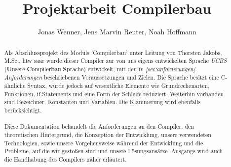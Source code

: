 \documentclass[12pt, a4paper, oneside, ngerman]{article}
\title{Projektarbeit Compilerbau}
\begin{document}
\author{Jonas Wenner, Jens Marvin Reuter, Noah Hoffmann}

\maketitle
\thispagestyle{empty}
\pagebreak
\tableofcontents
\newpage


\begin{abstract}

\noindent
Als Abschlussprojekt des Moduls 'Compilerbau' unter Leitung von Thorsten Jakobs, M.Sc., htw saar wurde dieser Compiler zur von uns eigens entwickelten Sprache \textit{UCBS} (\textbf{U}nsere \textbf{C}ompiler\textbf{b}au-\textbf{S}prache) entwickelt, mit den in \textit{\ref{sec:anforderungen}. Anforderungen} beschriebenen Voraussetzungen und Zielen. Die Sprache besitzt eine C-ähnliche Syntax, wurde jedoch auf wesentliche Elemente wie Grundrechenarten, Funktionen, if-Statements und eine Form der Schleife reduziert. Weiterhin vorhanden sind Bezeichner, Konstanten und Variablen. Die Klammerung wird ebenfalls berücksichtigt.
\\\\
Diese Dokumentation behandelt die Anforderungen an den Compiler, den theoretischen Hintergrund, die Konzeption der Entwicklung, unsere verwendeten Technologien, sowie unsere Vorgehensweise während der Entwicklung und die Probleme, auf die wir gestoßen sind und unsere Lösungsansätze. Ausgangs wird auch die Handhabung des Compilers näher erläutert.

\end{abstract}

\newpage

\pagebreak

\pagebreak

\pagebreak

\pagebreak

\pagebreak

\pagebreak

\pagebreak

\pagebreak
\end{document}
